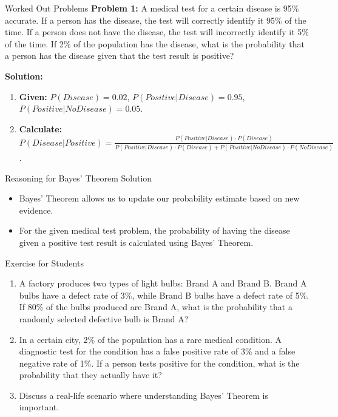 \begin{frame}{Worked Out Problems}
  \textbf{Problem 1:} A medical test for a certain disease is 95\% accurate. If a person has the disease, the test will correctly identify it 95\% of the time. If a person does not have the disease, the test will incorrectly identify it 5\% of the time. If 2\% of the population has the disease, what is the probability that a person has the disease given that the test result is positive?

  \textbf{Solution:}
  \begin{enumerate}
    \item \textbf{Given:} \( P(Disease) = 0.02 \), \( P(Positive|Disease) = 0.95 \), \( P(Positive|No Disease) = 0.05 \).
    \item \textbf{Calculate:} \( P(Disease|Positive) = \frac{P(Positive|Disease) \cdot P(Disease)}{P(Positive|Disease) \cdot P(Disease) + P(Positive|No Disease) \cdot P(No Disease)} \).
  \end{enumerate}
\end{frame}

\begin{frame}{Reasoning for Bayes' Theorem Solution}
  \begin{itemize}
    \item Bayes' Theorem allows us to update our probability estimate based on new evidence.
    \item For the given medical test problem, the probability of having the disease given a positive test result is calculated using Bayes' Theorem.
  \end{itemize}
\end{frame}

\begin{frame}{Exercise for Students}
  \begin{enumerate}
    \item A factory produces two types of light bulbs: Brand A and Brand B. Brand A bulbs have a defect rate of 3\%, while Brand B bulbs have a defect rate of 5\%. If 80\% of the bulbs produced are Brand A, what is the probability that a randomly selected defective bulb is Brand A?
    \item In a certain city, 2\% of the population has a rare medical condition. A diagnostic test for the condition has a false positive rate of 3\% and a false negative rate of 1\%. If a person tests positive for the condition, what is the probability that they actually have it?
    \item Discuss a real-life scenario where understanding Bayes' Theorem is important.
  \end{enumerate}
\end{frame}
